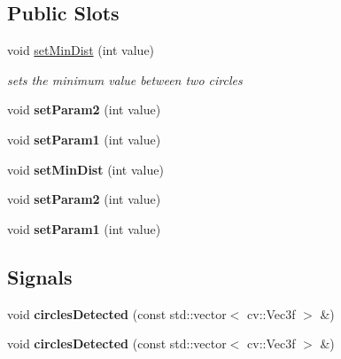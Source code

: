 \subsection*{Public Slots}
\begin{DoxyCompactItemize}
\item 
void \hyperlink{class_image_processor_1_1_detect_circle_a09bb7bbe753372179b49f94370800021}{set\+Min\+Dist} (int value)
\begin{DoxyCompactList}\small\item\em sets the minimum value between two circles \end{DoxyCompactList}\item 
\mbox{\label{class_image_processor_1_1_detect_circle_a6e695fba95e0e6f78620610eee6e00ca}} 
void {\bfseries set\+Param2} (int value)
\item 
\mbox{\label{class_image_processor_1_1_detect_circle_afbc2f237cbac9eb26334953aa5d2b9f0}} 
void {\bfseries set\+Param1} (int value)
\item 
\mbox{\label{class_image_processor_1_1_detect_circle_a58bc964674c740de77dd7ae7a8a4ad9f}} 
void {\bfseries set\+Min\+Dist} (int value)
\item 
\mbox{\label{class_image_processor_1_1_detect_circle_ac625b7c625afc225d71f82faa2a90b59}} 
void {\bfseries set\+Param2} (int value)
\item 
\mbox{\label{class_image_processor_1_1_detect_circle_adcdd5320b45b5387750bfa75e11c3ceb}} 
void {\bfseries set\+Param1} (int value)
\end{DoxyCompactItemize}
\subsection*{Signals}
\begin{DoxyCompactItemize}
\item 
\mbox{\label{class_image_processor_1_1_detect_circle_a24faeddbf059ed7011835dedbc7a2971}} 
void {\bfseries circles\+Detected} (const std\+::vector$<$ cv\+::\+Vec3f $>$ \&)
\item 
\mbox{\label{class_image_processor_1_1_detect_circle_a24faeddbf059ed7011835dedbc7a2971}} 
void {\bfseries circles\+Detected} (const std\+::vector$<$ cv\+::\+Vec3f $>$ \&)
\end{DoxyCompactItemize}

